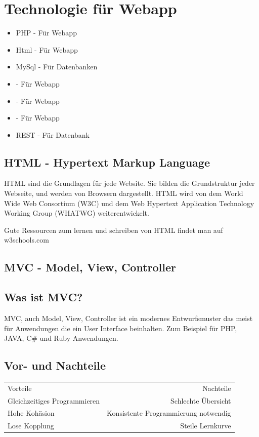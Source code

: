 \newpage	
\def \currentAuthor {Florian Tipotsch}
	\section{Technologie für Webapp}
\begin{itemize}
	\item PHP - Für Webapp
	\item Html - Für Webapp 	
	\item MySql - Für Datenbanken
	\item {} - Für Webapp
	\item {} - Für Webapp
	\item {} - Für Webapp
	\item REST - Für Datenbank
\end{itemize}
	\subsection{HTML - Hypertext Markup Language}
	HTML sind die Grundlagen für jede Website. Sie bilden die Grundstruktur jeder Webseite, und werden von Browsern dargestellt. HTML wird von dem World Wide Web Consortium (W3C) \cite{W3C} und dem Web Hypertext Application Technology Working Group (WHATWG) \cite{WHATWG} weiterentwickelt.
	
	Gute Ressourcen zum lernen und schreiben von HTML findet man auf w3schools.com \cite {W3schools}
	
	\subsection{MVC - Model, View, Controller}\label{sec:MVC}
	
	\subsection{Was ist MVC?} 
	MVC, auch Model, View, Controller ist ein modernes Entwurfsmuster das meist für Anwendungen die ein User Interface beinhalten. Zum Beispiel für PHP, JAVA, C\# und Ruby Anwendungen. \cite{MVC}
	
	\subsection{Vor- und Nachteile}
	\begin{tabular}{ l r }
		Vorteile & Nachteile \\
		Gleichzeitiges Programmieren & Schlechte Übersicht \\
		Hohe Kohäsion \cite{kohaesion} & Konsistente Programmierung notwendig\\
		Lose Kopplung \cite{kopplung} & Steile Lernkurve \\	
	\end{tabular}




